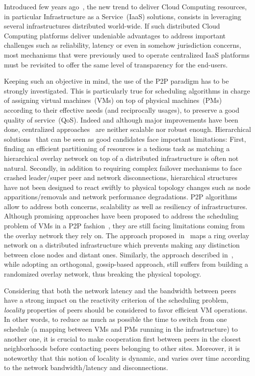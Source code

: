 Introduced few years ago~\cite{greenberg:sigcomm09}, the new trend to deliver Cloud
Computing resources, in particular Infrastructure as a Service~(IaaS) solutions, consists
in leveraging several infrastructures distributed world-wide. If such distributed Cloud
Computing platforms deliver undeniable advantages to address important challenges such as
reliability, latency or even in somehow jurisdiction concerns, most mechanisms that were
previously used to operate centralized IaaS platforms must be revisited to offer the same
level of transparency for the end-users.

Keeping such an objective in mind, the use of the P2P paradigm has to be strongly
investigated. This is particularly true for scheduling algorithms in charge
of assigning virtual machines~(VMs) on top of physical machines~(PMs) according to their effective needs (and reciprocally
usages), to preserve a good quality of service~(QoS). Indeed and although 
major improvements have been done, centralized
approaches~\cite{hermenier:2013} are neither scalable nor robust enough. Hierarchical
solutions~\cite{feller:ccgrid12} that can be seen as good candidates face important
limitations: First, finding an efficient partitioning of resources is a tedious task as
matching a hierarchical overlay network on top of a distributed infrastructure is often not
natural. Secondly, in addition to requiring complex failover mechanisms to face
crashed leader/super peer and network disconnections, hierarchical structures have not
been designed to react swiftly to physical topology changes such as node
apparitions/removals and network performance degradations. P2P algorithms allow to
address both concerns, \ie scalability as well as resiliency of infrastructures. Although
promising approaches have been proposed to address the scheduling problem of
VMs in a P2P fashion~\cite{quesnel:cpe2012,feller:cloudcom12}, they are still facing
limitations coming from the overlay network they rely on. The approach proposed
in~\cite{quesnel:cpe2012} maps a ring overlay network on a distributed infrastructure which
prevents making any distinction between close nodes and distant ones. Similarly, the
approach described in~\cite{feller:cloudcom12}, while adopting an orthogonal, gossip-based approach,
still suffers from building a randomized overlay network, thus breaking the physical topology.

Considering that both the network latency and the bandwidth between peers have a strong
impact on the reactivity criterion of the scheduling problem, \emph{locality} properties of
peers should be considered to favor efficient VM operations. In other words, to reduce as
much as possible the time to switch from one schedule (\ie a mapping between VMs and PMs
running in the infrastructure) to another one, it is crucial to make cooperation first
between peers in the closest neighborhoods before contacting peers belonging to other sites.
Moreover, it is noteworthy that this notion of locality is dynamic, and varies over time according
to the network bandwidth/latency and disconnections.

